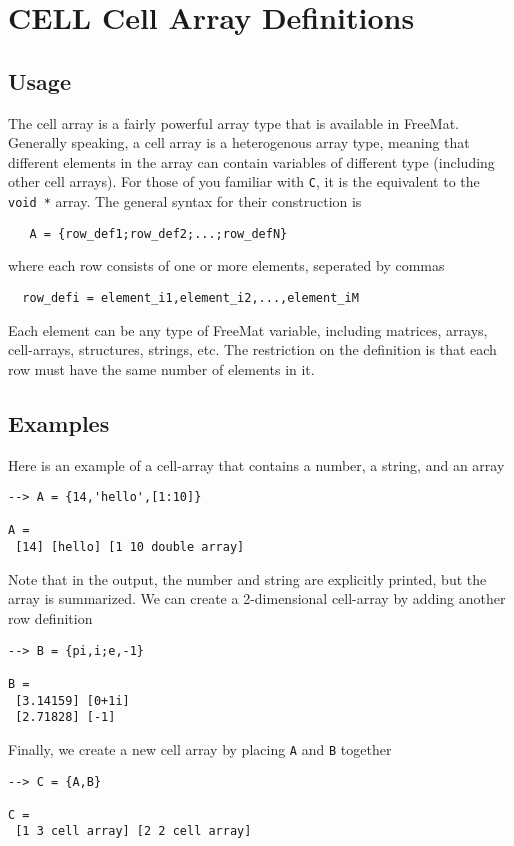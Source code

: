 \section{CELL Cell Array Definitions}

\subsection{Usage}

The cell array is a fairly powerful array type that is available
in FreeMat.  Generally speaking, a cell array is a heterogenous
array type, meaning that different elements in the array can 
contain variables of different type (including other cell arrays).
For those of you familiar with \verb|C|, it is the equivalent to the
\verb|void *| array.  The general syntax for their construction is
\begin{verbatim}
   A = {row_def1;row_def2;...;row_defN}
\end{verbatim}
where each row consists of one or more elements, seperated by
commas
\begin{verbatim}
  row_defi = element_i1,element_i2,...,element_iM
\end{verbatim}
Each element can be any type of FreeMat variable, including
matrices, arrays, cell-arrays, structures, strings, etc.  The
restriction on the definition is that each row must have the
same number of elements in it.
\subsection{Examples}

Here is an example of a cell-array that contains a number,
a string, and an array
\begin{verbatim}
--> A = {14,'hello',[1:10]}

A = 
 [14] [hello] [1 10 double array] 
\end{verbatim}
Note that in the output, the number and string are explicitly
printed, but the array is summarized.
We can create a 2-dimensional cell-array by adding another
row definition
\begin{verbatim}
--> B = {pi,i;e,-1}

B = 
 [3.14159] [0+1i] 
 [2.71828] [-1] 
\end{verbatim}
Finally, we create a new cell array by placing \verb|A| and \verb|B|
together
\begin{verbatim}
--> C = {A,B}

C = 
 [1 3 cell array] [2 2 cell array] 
\end{verbatim}
